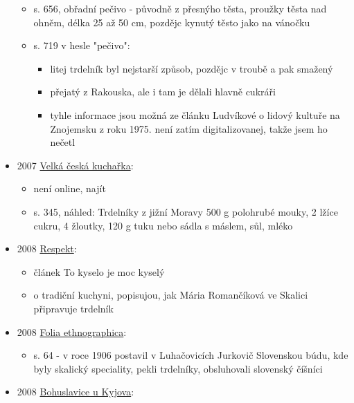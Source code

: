 \begin{itemize}
  \begin{itemize}
  \tightlist
  \item
    s. 656, obřadní pečivo - původně z přesnýho těsta, proužky těsta nad
    ohněm, délka 25 až 50 cm, pozdějc kynutý těsto jako na vánočku
  \item
    s. 719 v hesle "pečivo":

    \begin{itemize}
    \tightlist
    \item
      litej trdelník byl nejstarší způsob, pozdějc v troubě a pak
      smažený
    \item
      přejatý z Rakouska, ale i tam je dělali hlavně cukráři
    \item
      tyhle informace jsou možná ze článku Ludvíkové o lidový kultuře na
      Znojemsku z roku 1975. není zatím digitalizovanej, takže jsem ho
      nečetl
    \end{itemize}
  \end{itemize}
\item
  2007
  \href{https://www.digitalniknihovna.cz/mzk/uuid/uuid:a04a29d0-c0a2-11e8-bc37-005056827e51}{Velká
  česká kuchařka}:

  \begin{itemize}
  \tightlist
  \item
    není online, najít
  \item
    s. 345, náhled: Trdelníky z jižní Moravy 500 g polohrubé mouky, 2
    lžíce cukru, 4 žloutky, 120 g tuku nebo sádla s máslem, sůl, mléko
  \end{itemize}
\item
  2008
  \href{https://ceskadigitalniknihovna.cz/uuid/uuid:e0d7de90-55fc-11e3-bc9f-5ef3fc9bb22f}{Respekt}:

  \begin{itemize}
  \tightlist
  \item
    článek To kyselo je moc kyselý
  \item
    o tradiční kuchyni, popisujou, jak Mária Romančíková ve Skalici
    připravuje trdelník
  \end{itemize}
\item
  2008
  \href{https://ndk.cz/uuid/uuid:d30cd530-5bfb-11e4-97e9-5ef3fc9bb22f}{Folia
  ethnographica}:

  \begin{itemize}
  \tightlist
  \item
    s. 64 - v roce 1906 postavil v Luhačovicích Jurkovič Slovenskou
    búdu, kde byly skalický speciality, pekli trdelníky, obsluhovali
    slovenský číšníci
  \end{itemize}
\item
  2008
  \href{https://ceskadigitalniknihovna.cz/uuid/uuid:0986bb00-6623-11e3-ae59-005056827e52}{Bohuslavice
  u Kyjova}:


\end{itemize}
